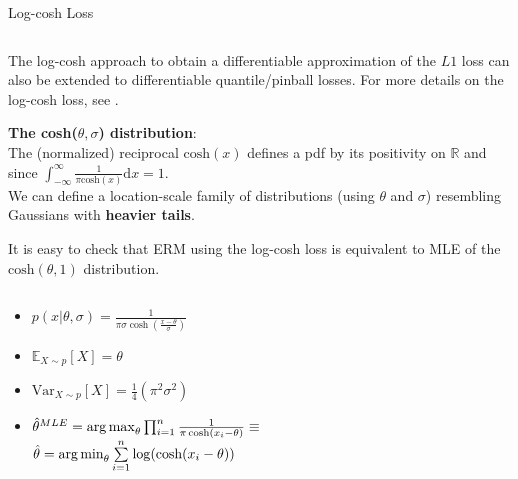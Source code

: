 \documentclass[11pt,compress,t,notes=noshow, xcolor=table]{beamer}
\begin{document}
\begin{vbframe}{Log-cosh Loss}
\begin{columns}
\end{columns}

The log-cosh approach to obtain a differentiable approximation of the $L1$ loss can also be extended to  differentiable quantile/pinball losses. For more details on the log-cosh loss, see  .

\framebreak

\textbf{The cosh($\theta,\sigma$) distribution}:\\
The (normalized) reciprocal $\text{cosh}(x)$ defines a pdf by its positivity on $\mathbb{R}$ and since $\int_{-\infty}^{\infty} \frac{1}{\pi \text{cosh}(x)} \text{d}x = 1$.\\
\vspace{0.1cm}
We can define a location-scale family of distributions (using $\theta$ and $\sigma$) resembling Gaussians with \textbf{heavier tails}. 

It is easy to check that ERM using the log-cosh loss is equivalent to MLE of the $\text{cosh}(\theta,1)$ distribution.

\begin{columns}

\begin{column}{0.5\textwidth}

{\normalsize 
\begin{itemize}\setlength{\itemsep}{0.32em}
    \item $p(x | \theta, \sigma)=\frac{1}{\pi \sigma \cosh \left(\frac{x-\theta}{\sigma}\right)}$
    \item $\mathbb{E}_{X\sim p}[X]=\theta$
    \item $\text{Var}_{X \sim p}[X]=\frac{1}{4}(\pi^2 \sigma^2)$
    \item {\footnotesize $\hat{\theta}^{MLE}=\operatorname*{arg\,max}_{\theta} \prod_{i=1}^n \frac{1}{\pi \cosh \left(x_i-\theta\right)} \equiv$}\\{\footnotesize $\hat{\theta} = \operatorname*{arg\,min}_{\theta}\sum\limits_{i=1}^n \log(\text{cosh}(x_i-\theta))$}
\end{itemize}
}
\end{column}

\begin{column}{0.7\textwidth}

\begin{figure}
      \centering
    \end{figure}


\end{column}
\end{columns}
\end{vbframe}
\end{document}
